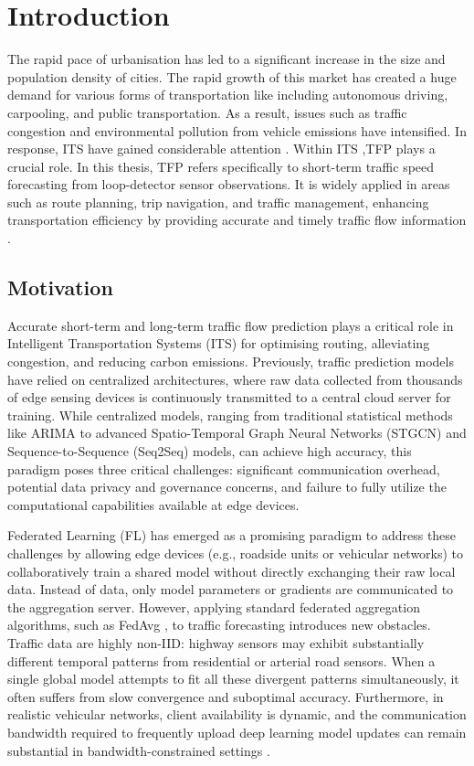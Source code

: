 \chapter{Introduction}
\label{chap:intro}

The rapid pace of urbanisation has led to a significant increase in the size and population density of cities. The rapid growth of this market has created a huge demand for various forms of transportation like including autonomous driving, carpooling, and public transportation. As a result, issues such as traffic congestion and environmental pollution from vehicle emissions have intensified. In response, \ac{ITS} have gained considerable attention \cite{lin2017intelligent, luo2021spatial}. Within ITS ,\ac{TFP} plays a crucial role. In this thesis, TFP refers specifically to short-term traffic speed forecasting from loop-detector sensor observations. It is widely applied in areas such as route planning, trip navigation, and traffic management, enhancing transportation efficiency by providing accurate and timely traffic flow information \cite{dai2020hybrid}.

\section{Motivation} \label{sec:s1}
Accurate short-term and long-term traffic flow prediction plays a critical role in Intelligent Transportation Systems (ITS) for optimising routing, alleviating congestion, and reducing carbon emissions. Previously, traffic prediction models have relied on centralized architectures, where raw data collected from thousands of edge sensing devices is continuously transmitted to a central cloud server for training. While centralized models, ranging from traditional statistical methods like ARIMA to advanced Spatio-Temporal Graph Neural Networks (STGCN) and Sequence-to-Sequence (Seq2Seq) models, can achieve high accuracy, this paradigm poses three critical challenges: significant communication overhead, potential data privacy and governance concerns, and failure to fully utilize the computational capabilities available at edge devices.

Federated Learning (FL) has emerged as a promising paradigm to address these challenges by allowing edge devices (e.g., roadside units or vehicular networks) to collaboratively train a shared model without directly exchanging their raw local data. Instead of data, only model parameters or gradients are communicated to the aggregation server. However, applying standard federated aggregation algorithms, such as \ac{FedAvg} \cite{mcmahan2017}, to traffic forecasting introduces new obstacles. Traffic data are highly \ac{non-IID}: highway sensors may exhibit substantially different temporal patterns from residential or arterial road sensors. When a single global model attempts to fit all these divergent patterns simultaneously, it often suffers from slow convergence and suboptimal accuracy. Furthermore, in realistic vehicular networks, client availability is dynamic, and the communication bandwidth required to frequently upload deep learning model updates can remain substantial in bandwidth-constrained settings \cite{zhu2025cmba}.

